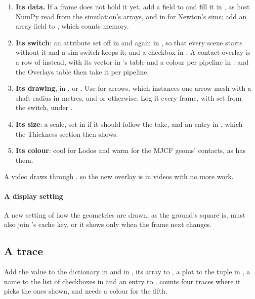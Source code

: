 \begin{enumerate}
\item \textbf{Its data.} If a frame does not hold it yet, add a field to  and fill it in , as host NumPy read from the simulation's arrays, and in  for Newton's sims; add an array field to , which counts memory.
\item \textbf{Its switch}: an attribute set off in  and again in , so that every scene starts without it and a sim switch keeps it; and a checkbox in . A contact overlay is a row of  instead, with its vector in 's table and a colour per pipeline in :  and the Overlays table then take it per pipeline.
\item \textbf{Its drawing}, in ,  or . Use  for arrows, which instances one arrow mesh with a shaft radius in metres, and  or  otherwise. Log it every frame, with  set from the switch, under .
\item \textbf{Its size}: a scale, set in  if it should follow the take, and an entry in , which the Thickness section then shows.
\item \textbf{Its colour}: cool for Lodos and warm for the MJCF geoms' contacts, as  has them.
\end{enumerate}

A video draws through , so the new overlay is in videos with no more work.

\paragraph{A display setting} A new setting of how the geometries are drawn, as the ground's square is, must also join 's cache key, or it shows only when the frame next changes.

\subsection{A trace}\label{sec:newtrace}

Add the value to the  dictionary in  and in , its array to , a plot to the  tuple in , a name to the list of checkboxes in  and an entry to .  counts four traces where it picks the ones shown, and  needs a colour for the fifth.

